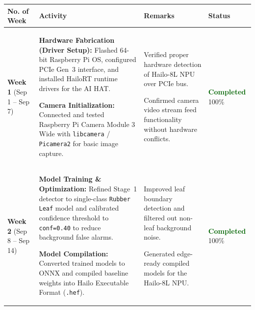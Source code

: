 \documentclass[10pt,a4paper]{article}
\begin{document}
\renewcommand{\arraystretch}{1.4}
\begin{tabularx}{\textwidth}{@{} p{2.2cm} >{\raggedright\arraybackslash}X >{\raggedright\arraybackslash}X p{2.0cm} @{}}
\toprule
\textbf{No. of Week} & \textbf{Activity} & \textbf{Remarks} & \textbf{Status} \\
\midrule

\textbf{Week 1}\newline
\footnotesize{(Sep 1 -- Sep 7)} & 
\begin{tableitems}
    \item \textbf{Hardware Fabrication (Driver Setup):} Flashed 64-bit Raspberry Pi OS, configured PCIe Gen~3 interface, and installed HailoRT runtime drivers for the AI HAT.
    \item \textbf{Camera Initialization:} Connected and tested Raspberry Pi Camera Module 3 Wide with \texttt{libcamera} / \texttt{Picamera2} for basic image capture.
\end{tableitems} & 
\begin{tableitems}
    \item Verified proper hardware detection of Hailo-8L NPU over PCIe bus.
    \item Confirmed camera video stream feed functionality without hardware conflicts.
\end{tableitems} & 
\textcolor{darkgreen}{\textbf{Completed}}\newline
\footnotesize{100\%} \\

\midrule

\textbf{Week 2}\newline
\footnotesize{(Sep 8 -- Sep 14)} & 
\begin{tableitems}
    \item \textbf{Model Training \& Optimization:} Refined Stage~1 detector to single-class \texttt{Rubber Leaf} model and calibrated confidence threshold to \texttt{conf=0.40} to reduce background false alarms.
    \item \textbf{Model Compilation:} Converted trained models to ONNX and compiled baseline weights into Hailo Executable Format (\texttt{.hef}).
\end{tableitems} & 
\begin{tableitems}
    \item Improved leaf boundary detection and filtered out non-leaf background noise.
    \item Generated edge-ready compiled models for the Hailo-8L NPU.
\end{tableitems} & 
\textcolor{darkgreen}{\textbf{Completed}}\newline
\footnotesize{100\%} \\


\end{tabularx}
\end{document}
